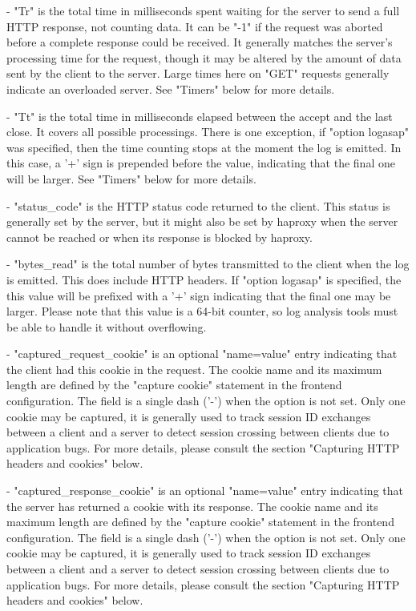  - "Tr" is the total time in milliseconds spent waiting for the server to send
    a full HTTP response, not counting data. It can be "-1" if the request was
    aborted before a complete response could be received. It generally matches
    the server's processing time for the request, though it may be altered by
    the amount of data sent by the client to the server. Large times here on
    "GET" requests generally indicate an overloaded server. See "Timers" below
    for more details.

  - "Tt" is the total time in milliseconds elapsed between the accept and the
    last close. It covers all possible processings. There is one exception, if
    "option logasap" was specified, then the time counting stops at the moment
    the log is emitted. In this case, a '+' sign is prepended before the value,
    indicating that the final one will be larger. See "Timers" below for more
    details.

  - "status_code" is the HTTP status code returned to the client. This status
    is generally set by the server, but it might also be set by haproxy when
    the server cannot be reached or when its response is blocked by haproxy.

  - "bytes_read" is the total number of bytes transmitted to the client when
    the log is emitted. This does include HTTP headers. If "option logasap" is
    specified, the this value will be prefixed with a '+' sign indicating that
    the final one may be larger. Please note that this value is a 64-bit
    counter, so log analysis tools must be able to handle it without
    overflowing.

  - "captured_request_cookie" is an optional "name=value" entry indicating that
    the client had this cookie in the request. The cookie name and its maximum
    length are defined by the "capture cookie" statement in the frontend
    configuration. The field is a single dash ('-') when the option is not
    set. Only one cookie may be captured, it is generally used to track session
    ID exchanges between a client and a server to detect session crossing
    between clients due to application bugs. For more details, please consult
    the section "Capturing HTTP headers and cookies" below.

  - "captured_response_cookie" is an optional "name=value" entry indicating
    that the server has returned a cookie with its response. The cookie name
    and its maximum length are defined by the "capture cookie" statement in the
    frontend configuration. The field is a single dash ('-') when the option is
    not set. Only one cookie may be captured, it is generally used to track
    session ID exchanges between a client and a server to detect session
    crossing between clients due to application bugs. For more details, please
    consult the section "Capturing HTTP headers and cookies" below.

